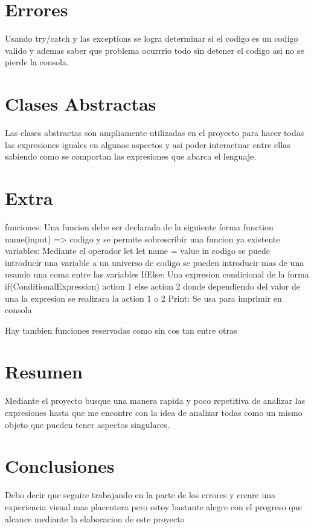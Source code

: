 \documentclass{article}
\begin{document}
\newpage 
\section*{Errores}
Usando try/catch y las exceptions se logra determinar si el codigo es un codigo valido y ademas saber que problema ocurrrio todo sin detener el codigo asi no se pierde la consola.

\newpage 
\section*{Clases Abstractas}
Las clases abstractas son ampliamente utilizadas en el proyecto para hacer todas las expresiones iguales en algunos aspectos y asi poder interactuar entre ellas sabiendo como se comportan las expresiones que abarca el lenguaje.

\newpage 
\section*{Extra}
funciones:
Una funcion debe ser declarada de la siguiente forma 
function name(input) => codigo
y se permite sobrescribir una funcion ya existente
variables:
Mediante el operador let
let name = value in codigo
se puede introducir una variable a un universo de codigo
se pueden introducir mas de una usando una coma entre las variables
IfElse:
Una expresion condicional de la forma
if(ConditionalExpression) action 1 else action 2
donde dependiendo del valor de una la expresion se realizara la action 1 o 2
Print:
Se usa para imprimir en consola 
 
Hay tambien funciones reservadas como sin cos tan entre otras

\newpage
\section*{Resumen}
Mediante el proyecto busque una manera rapida y poco repetitiva de analizar las expresiones hasta que me encontre con la idea de analizar todas como un mismo objeto que pueden tener aspectos singulares.

\newpage 
\section*{Conclusiones}
Debo decir que seguire trabajando en la parte de los errores y creare una experiencia visual mas placentera pero estoy bastante alegre con el progreso que alcance mediante la elaboracion de este proyecto
\end{document}
